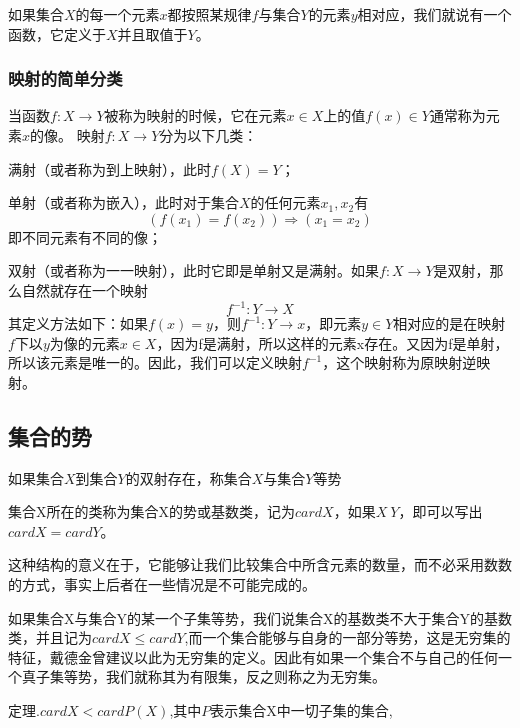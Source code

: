 如果集合$X$的每一个元素$x$都按照某规律$f$与集合$Y$的元素$y$相对应，我们就说有一个函数，它定义于$X$并且取值于$Y$。
\subsubsection{映射的简单分类}
当函数$f:X\rightarrow Y$被称为映射的时候，它在元素$x\in X$上的值$f(x)\in Y$通常称为元素$x$的像。
映射$f:X\rightarrow Y$分为以下几类：

满射（或者称为到上映射），此时$f(X)=Y$；

单射（或者称为嵌入），此时对于集合$X$的任何元素$x_1,x_2$有
\[(f(x_1)=f(x_2))\Rightarrow (x_1=x_2)\]
即不同元素有不同的像；

双射（或者称为一一映射），此时它即是单射又是满射。如果$f:X\rightarrow Y$是双射，那么自然就存在一个映射
\[f^{-1}:Y\rightarrow X\]
其定义方法如下：如果$f(x)=y$，则$f^{-1}:Y\rightarrow x$，即元素$y\in Y$相对应的是在映射$f$下以$y$为像的元素$x\in X$，因为f是满射，所以这样的元素x存在。又因为f是单射，所以该元素是唯一的。因此，我们可以定义映射$f^{-1}$，这个映射称为原映射逆映射。
\subsection{集合的势}
如果集合$X$到集合$Y$的双射存在，称集合$X$与集合$Y$等势

集合X所在的类称为集合X的势或基数类，记为$cardX$，如果$X~Y$，即可以写出$cardX=cardY$。

这种结构的意义在于，它能够让我们比较集合中所含元素的数量，而不必采用数数的方式，事实上后者在一些情况是不可能完成的。

如果集合X与集合Y的某一个子集等势，我们说集合X的基数类不大于集合Y的基数类，并且记为$cardX\leq cardY$,而一个集合能够与自身的一部分等势，这是无穷集的特征，戴德金曾建议以此为无穷集的定义。因此有如果一个集合不与自己的任何一个真子集等势，我们就称其为有限集，反之则称之为无穷集。

定理.$cardX<cardP(X)$,其中$P$表示集合X中一切子集的集合,